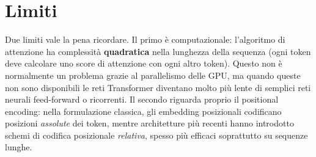 \documentclass[11pt,a4paper]{report}
\begin{document}
\section{Limiti}

Due limiti vale la pena ricordare. Il primo è computazionale: l'algoritmo di attenzione ha complessità \textbf{quadratica} nella lunghezza della sequenza (ogni token deve calcolare uno score di attenzione con ogni altro token). Questo non è normalmente un problema grazie al parallelismo delle GPU, ma quando queste non sono disponibili le reti Transformer diventano molto più lente di semplici reti neurali feed-forward o ricorrenti. Il secondo riguarda proprio il positional encoding: nella formulazione classica, gli embedding posizionali codificano posizioni \emph{assolute} dei token, mentre architetture più recenti hanno introdotto schemi di codifica posizionale \emph{relativa}, spesso più efficaci soprattutto su sequenze lunghe.
\end{document}
